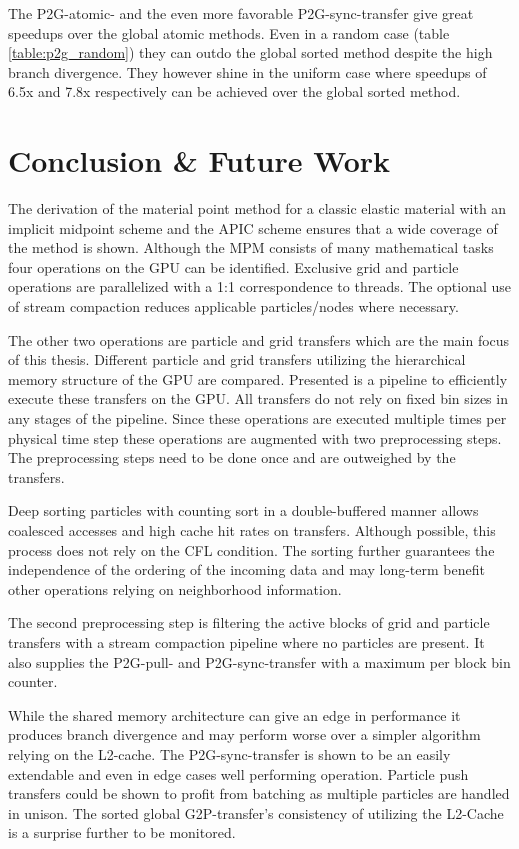 \documentclass[m,times]{cgMA}
\begin{document}
The P2G-atomic- and the even more favorable P2G-sync-transfer give great speedups over the global atomic methods. Even in a random case (table \ref{table:p2g_random}) they can outdo the global sorted method despite the high branch divergence. They however shine in the uniform case where speedups of 6.5x and 7.8x respectively can be achieved over the global sorted method.
\clearpage
\section{Conclusion \& Future Work}\label{sec:conclusion}
The derivation of the material point method for a classic elastic material with an implicit midpoint scheme and the APIC scheme ensures that a wide coverage of the method is shown. Although the MPM consists of many mathematical tasks four operations on the GPU can be identified. Exclusive grid and particle operations are parallelized with a 1:1 correspondence to threads. The optional use of stream compaction reduces applicable particles/nodes where necessary.

The other two operations are particle and grid transfers which are the main focus of this thesis. Different particle and grid transfers utilizing the hierarchical memory structure of the GPU are compared. Presented is a pipeline to efficiently execute these transfers on the GPU. All transfers do not rely on fixed bin sizes in any stages of the pipeline. Since these operations are executed multiple times per physical time step these operations are augmented with two preprocessing steps. The preprocessing steps need to be done once and are outweighed by the transfers.

Deep sorting particles with counting sort in a double-buffered manner allows coalesced accesses and high cache hit rates on transfers. Although possible, this process does not rely on the CFL condition. The sorting further guarantees the independence of the ordering of the incoming data and may long-term benefit other operations relying on neighborhood information.

The second preprocessing step is filtering the active blocks of grid and particle transfers with a stream compaction pipeline where no particles are present. It also supplies the P2G-pull- and P2G-sync-transfer with a maximum per block bin counter.

While the shared memory architecture can give an edge in performance it produces branch divergence and may perform worse over a simpler algorithm relying on the L2-cache. The P2G-sync-transfer is shown to be an easily extendable and even in edge cases well performing operation. Particle push transfers could be shown to profit from batching as multiple particles are handled in unison. The sorted global G2P-transfer's consistency of utilizing the L2-Cache is a surprise further to be monitored.
\end{document}
